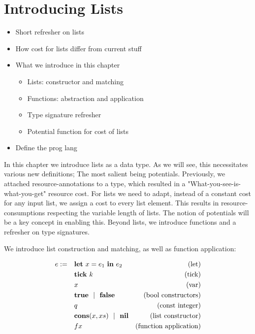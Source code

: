 \chapter{Introducing Lists}
\begin{itemize}
   \item Short refresher on lists
   \item How cost for lists differ from current stuff
   \item What we introduce in this chapter
      \begin{itemize}
         \item Lists: constructor and matching
         \item Functions: abstraction and application
         \item Type signature refresher
         \item Potential function for cost of lists
      \end{itemize}
   \item Define the prog lang
\end{itemize}

In this chapter we introduce lists as a data type. As we will see, this necessitates various new definitions; The most salient being potentials. Previously, we attached resource-annotations to a type, which resulted in a "What-you-see-is-what-you-get" resource cost. For lists we need to adapt, instead of a constant cost for any input list, we assign a cost to every list element. This results in resource-consumptions respecting the variable length of lists. The notion of potentials will be a key concept in enabling this. Beyond lists, we introduce functions and a refresher on type signatures.

We introduce list construction and matching, as well as function application:


\begin{definition}
   \label{def:prog-lang-5}

\begin{align*}
   e := ~~~ & \mathbf{let}~x = e_1~\mathbf{in}~e_2		& \text{(let)}\\
            & \mathbf{tick}~k				& \text{(tick)}\\
	    & x					& \text{(var)}\\
	    & \mathbf{true} ~~| ~~\mathbf{false}		& \text{(bool constructors)}\\
	    & q					& \text{(const integer)}\\
            & \textbf{cons}(x, xs) ~~| ~~ \textbf{nil}      & \text{(list constructor)}\\
            & f x                               & \text{(function application)}\\
\end{align*}

\end{definition}


